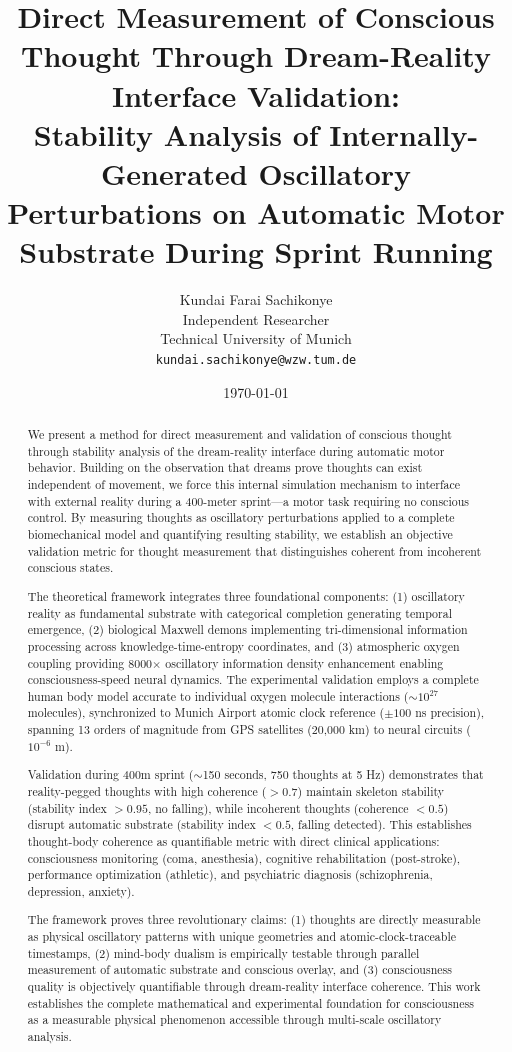 \documentclass[12pt,twocolumn]{article}
\title{\textbf{Direct Measurement of Conscious Thought Through Dream-Reality Interface Validation:\\ Stability Analysis of Internally-Generated Oscillatory Perturbations on Automatic Motor Substrate During Sprint Running}}
\author{
Kundai Farai Sachikonye\\
Independent Researcher\\
Technical University of Munich\\
\texttt{kundai.sachikonye@wzw.tum.de}
}
\date{\today}
\theoremstyle{remark}
\begin{document}
\maketitle

\begin{abstract}
We present a method for direct measurement and validation of conscious thought through stability analysis of the dream-reality interface during automatic motor behavior. Building on the observation that dreams prove thoughts can exist independent of movement, we force this internal simulation mechanism to interface with external reality during a 400-meter sprint---a motor task requiring no conscious control. By measuring thoughts as oscillatory perturbations applied to a complete biomechanical model and quantifying resulting stability, we establish an objective validation metric for thought measurement that distinguishes coherent from incoherent conscious states.

The theoretical framework integrates three foundational components: (1) oscillatory reality as fundamental substrate with categorical completion generating temporal emergence, (2) biological Maxwell demons implementing tri-dimensional information processing across knowledge-time-entropy coordinates, and (3) atmospheric oxygen coupling providing 8000$\times$ oscillatory information density enhancement enabling consciousness-speed neural dynamics. The experimental validation employs a complete human body model accurate to individual oxygen molecule interactions ($\sim 10^{27}$ molecules), synchronized to Munich Airport atomic clock reference ($\pm 100$ ns precision), spanning 13 orders of magnitude from GPS satellites (20,000 km) to neural circuits ($10^{-6}$ m).

Validation during 400m sprint ($\sim$150 seconds, 750 thoughts at 5 Hz) demonstrates that reality-pegged thoughts with high coherence (${>}0.7$) maintain skeleton stability (stability index ${>}0.95$, no falling), while incoherent thoughts (coherence ${<}0.5$) disrupt automatic substrate (stability index ${<}0.5$, falling detected). This establishes thought-body coherence as quantifiable metric with direct clinical applications: consciousness monitoring (coma, anesthesia), cognitive rehabilitation (post-stroke), performance optimization (athletic), and psychiatric diagnosis (schizophrenia, depression, anxiety).

The framework proves three revolutionary claims: (1) thoughts are directly measurable as physical oscillatory patterns with unique geometries and atomic-clock-traceable timestamps, (2) mind-body dualism is empirically testable through parallel measurement of automatic substrate and conscious overlay, and (3) consciousness quality is objectively quantifiable through dream-reality interface coherence. This work establishes the complete mathematical and experimental foundation for consciousness as a measurable physical phenomenon accessible through multi-scale oscillatory analysis.


\end{abstract}
\end{document}
